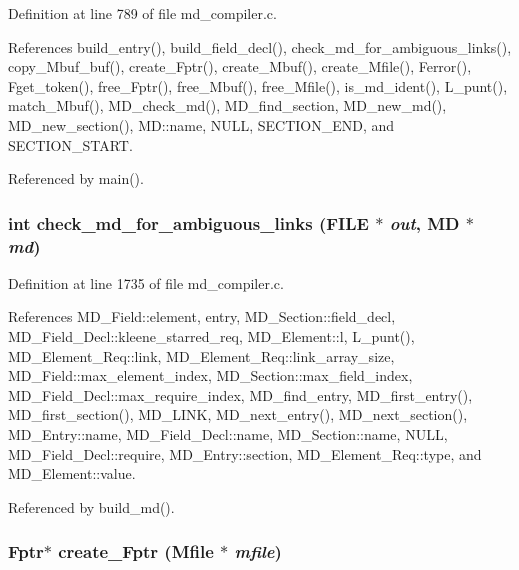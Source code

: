 Definition at line 789 of file md\_\-compiler.c.

References build\_\-entry(), build\_\-field\_\-decl(), check\_\-md\_\-for\_\-ambiguous\_\-links(), copy\_\-Mbuf\_\-buf(), create\_\-Fptr(), create\_\-Mbuf(), create\_\-Mfile(), Ferror(), Fget\_\-token(), free\_\-Fptr(), free\_\-Mbuf(), free\_\-Mfile(), is\_\-md\_\-ident(), L\_\-punt(), match\_\-Mbuf(), MD\_\-check\_\-md(), MD\_\-find\_\-section, MD\_\-new\_\-md(), MD\_\-new\_\-section(), MD::name, NULL, SECTION\_\-END, and SECTION\_\-START.

Referenced by main().
\subsubsection{\setlength{\rightskip}{0pt plus 5cm}int check\_\-md\_\-for\_\-ambiguous\_\-links (FILE $\ast$ {\em out}, \bf{MD} $\ast$ {\em md})}\label{md__compiler_8c_5dc602835cc716539a36da4c7fe7fa45}




Definition at line 1735 of file md\_\-compiler.c.

References MD\_\-Field::element, entry, MD\_\-Section::field\_\-decl, MD\_\-Field\_\-Decl::kleene\_\-starred\_\-req, MD\_\-Element::l, L\_\-punt(), MD\_\-Element\_\-Req::link, MD\_\-Element\_\-Req::link\_\-array\_\-size, MD\_\-Field::max\_\-element\_\-index, MD\_\-Section::max\_\-field\_\-index, MD\_\-Field\_\-Decl::max\_\-require\_\-index, MD\_\-find\_\-entry, MD\_\-first\_\-entry(), MD\_\-first\_\-section(), MD\_\-LINK, MD\_\-next\_\-entry(), MD\_\-next\_\-section(), MD\_\-Entry::name, MD\_\-Field\_\-Decl::name, MD\_\-Section::name, NULL, MD\_\-Field\_\-Decl::require, MD\_\-Entry::section, MD\_\-Element\_\-Req::type, and MD\_\-Element::value.

Referenced by build\_\-md().
\subsubsection{\setlength{\rightskip}{0pt plus 5cm}\bf{Fptr}$\ast$ create\_\-Fptr (\bf{Mfile} $\ast$ {\em mfile})}\label{md__compiler_8c_cd6abca353981f824cbc6b4b39b96326}




